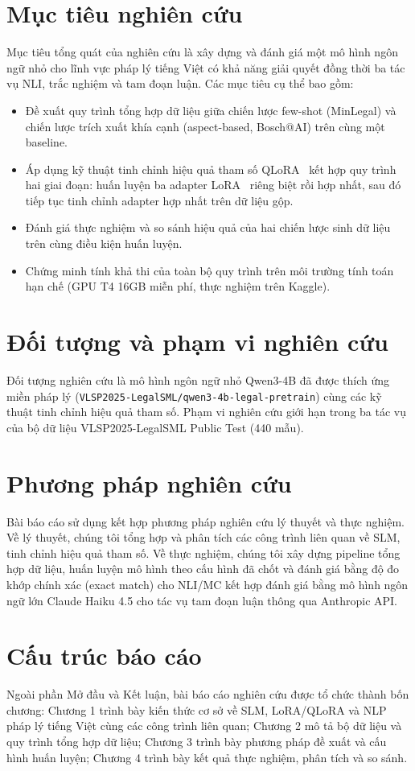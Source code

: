 \section*{Mục tiêu nghiên cứu}

Mục tiêu tổng quát của nghiên cứu là xây dựng và đánh giá một mô hình ngôn ngữ nhỏ cho lĩnh vực pháp lý tiếng Việt có khả năng giải quyết đồng thời ba tác vụ NLI, trắc nghiệm và tam đoạn luận. Các mục tiêu cụ thể bao gồm:

\begin{itemize}
    \item Đề xuất quy trình tổng hợp dữ liệu giữa chiến lược few-shot (MinLegal) và chiến lược trích xuất khía cạnh (aspect-based, Bosch@AI) trên cùng một baseline.
    \item Áp dụng kỹ thuật tinh chỉnh hiệu quả tham số QLoRA~\cite{dettmers2023qlora} kết hợp quy trình hai giai đoạn: huấn luyện ba adapter LoRA~\cite{hu2022lora} riêng biệt rồi hợp nhất, sau đó tiếp tục tinh chỉnh adapter hợp nhất trên dữ liệu gộp.
    \item Đánh giá thực nghiệm và so sánh hiệu quả của hai chiến lược sinh dữ liệu trên cùng điều kiện huấn luyện.
    \item Chứng minh tính khả thi của toàn bộ quy trình trên môi trường tính toán hạn chế (GPU T4 16GB miễn phí, thực nghiệm trên Kaggle).
\end{itemize}

\section*{Đối tượng và phạm vi nghiên cứu}

Đối tượng nghiên cứu là mô hình ngôn ngữ nhỏ Qwen3-4B đã được thích ứng miền pháp lý (\texttt{VLSP2025-LegalSML/qwen3-4b-legal-pretrain}) cùng các kỹ thuật tinh chỉnh hiệu quả tham số. Phạm vi nghiên cứu giới hạn trong ba tác vụ của bộ dữ liệu VLSP2025-LegalSML Public Test (440 mẫu).

\section*{Phương pháp nghiên cứu}

Bài báo cáo sử dụng kết hợp phương pháp nghiên cứu lý thuyết và thực nghiệm. Về lý thuyết, chúng tôi tổng hợp và phân tích các công trình liên quan về SLM, tinh chỉnh hiệu quả tham số. Về thực nghiệm, chúng tôi xây dựng pipeline tổng hợp dữ liệu, huấn luyện mô hình theo cấu hình đã chốt và đánh giá bằng độ đo khớp chính xác (exact match) cho NLI/MC kết hợp đánh giá bằng mô hình ngôn ngữ lớn Claude Haiku 4.5 cho tác vụ tam đoạn luận thông qua Anthropic API.

\section*{Cấu trúc báo cáo}

Ngoài phần Mở đầu và Kết luận, bài báo cáo nghiên cứu được tổ chức thành bốn chương: Chương 1 trình bày kiến thức cơ sở về SLM, LoRA/QLoRA và NLP pháp lý tiếng Việt cùng các công trình liên quan; Chương 2 mô tả bộ dữ liệu và quy trình tổng hợp dữ liệu; Chương 3 trình bày phương pháp đề xuất và cấu hình huấn luyện; Chương 4 trình bày kết quả thực nghiệm, phân tích và so sánh.
